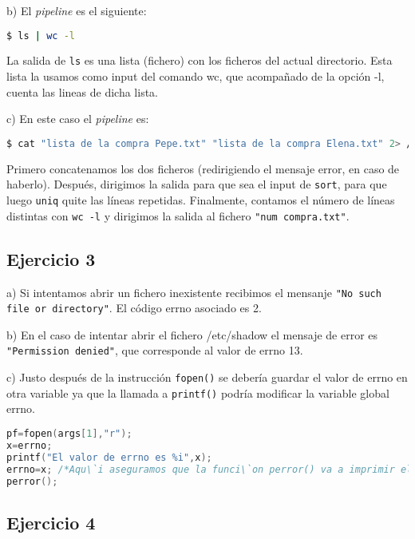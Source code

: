 \documentclass{article}
\begin{document}
b) El \textit{pipeline} es el siguiente:

\begin{lstlisting}[language=bash]
$ ls | wc -l
\end{lstlisting}

La salida de \texttt{ls} es una lista (fichero) con los ficheros del actual directorio.
Esta lista la usamos como input del comando wc, que acompañado de la opción -l, cuenta las lineas de dicha lista.


c) En este caso el \textit{pipeline} es: 

\begin{lstlisting}[language=bash]
$ cat "lista de la compra Pepe.txt" "lista de la compra Elena.txt" 2> /dev/null | sort | uniq | wc -l > "num compra.txt"
\end{lstlisting}

Primero concatenamos los dos ficheros (redirigiendo el mensaje error, en caso de haberlo). Después, dirigimos la salida para que sea el input de \texttt{sort}, para que luego \texttt{uniq} quite las líneas repetidas. Finalmente, contamos el número de líneas distintas con \texttt{wc -l} y dirigimos la salida al fichero \texttt{"num compra.txt"}.

\subsection*{Ejercicio 3}

a) Si intentamos abrir un fichero inexistente recibimos el mensanje \texttt{"No such file or directory"}. El código errno asociado es 2.

b) En el caso de intentar abrir el fichero /etc/shadow el  mensaje de error es \texttt{"Permission denied"}, que corresponde al valor de errno 13.

c) Justo después de la instrucción \texttt{fopen()} se debería guardar el valor de errno en otra variable ya que la llamada a \texttt{printf()} podría modificar la variable global errno.

\begin{lstlisting}[language=C]
pf=fopen(args[1],"r"); 
x=errno;
printf("El valor de errno es %i",x);
errno=x; /*Aqu\`i aseguramos que la funci\`on perror() va a imprimir el c\`odigo de error de fopen ya que hemos restaurado el valor de errno asociado a fopen()*/
perror();
\end{lstlisting}


\subsection*{Ejercicio 4}
\end{document}
